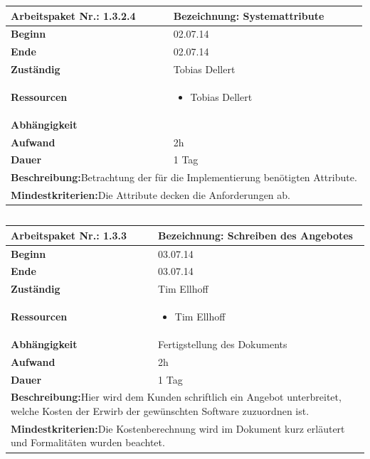 \documentclass[fontsize=12pt,paper=a4,twoside]{scrartcl}
\begin{document}
\begin{verbatim} 
\end{verbatim}

\begin{tabular}{|p{5.3cm}|p{9.7cm}|}\hline
	\textbf{Arbeitspaket Nr.:} 1.3.2.4 & \textbf{Bezeichnung:} Systemattribute\\ \hline \hline
	\textbf{Beginn} & 02.07.14\\ \hline
	\textbf{Ende} & 02.07.14\\ \hline
	\textbf{Zuständig} & Tobias Dellert\\ \hline
	\textbf{Ressourcen} & \begin{itemize}
		\item Tobias Dellert 
	\end{itemize}    \\ \hline
	\textbf{Abhängigkeit} &\\ \hline
	\textbf{Aufwand} & 2h\\ \hline
	\textbf{Dauer} & 1 Tag\\ \hline
	\multicolumn{2}{|p{15cm}|}{\textbf{Beschreibung:}\newline Betrachtung der für die Implementierung benötigten Attribute. }\\ \hline
	\multicolumn{2}{|p{15cm}|}{\textbf{Mindestkriterien:}\newline Die Attribute decken die Anforderungen ab. }\\ \hline
\end{tabular}

\begin{verbatim} 
\end{verbatim}

\begin{tabular}{|p{5.3cm}|p{9.7cm}|}\hline
	\textbf{Arbeitspaket Nr.:} 1.3.3 & \textbf{Bezeichnung:} Schreiben des Angebotes\\ \hline \hline
	\textbf{Beginn} & 03.07.14\\ \hline
	\textbf{Ende} & 03.07.14\\ \hline
	\textbf{Zuständig} & Tim Ellhoff\\ \hline
	\textbf{Ressourcen} & \begin{itemize}
		\item Tim Ellhoff
	\end{itemize}    \\ \hline
	\textbf{Abhängigkeit} & Fertigstellung des Dokuments\\ \hline
	\textbf{Aufwand} & 2h\\ \hline
	\textbf{Dauer} & 1 Tag\\ \hline
	\multicolumn{2}{|p{15cm}|}{\textbf{Beschreibung:}\newline Hier wird dem Kunden schriftlich ein Angebot unterbreitet, welche Kosten der Erwirb der gewünschten Software zuzuordnen ist. }\\ \hline
	\multicolumn{2}{|p{15cm}|}{\textbf{Mindestkriterien:}\newline Die Kostenberechnung wird im Dokument kurz erläutert und Formalitäten wurden beachtet. }\\ \hline
\end{tabular}
\end{document}

